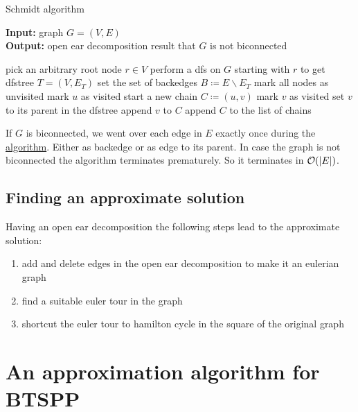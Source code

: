 \begin{algorithm}
  \caption{Schmidt algorithm}\label{alg:schmidt}
  \textbf{Input: } graph \(G = (V, E)\)\\
  \textbf{Output: } open ear decomposition result that \(G\) is not biconnected
  \begin{algorithmic}[1]
      \State pick an arbitrary root node \(r \in V\)
      \State perform a \gls{dfs} on \(G\) starting with \(r\) to get \gls{dfstree} \(T = (V, E_T)\)
        \State{}
      \EndIf
      \State set the set of backedges \(B \coloneqq E \backslash E_T\)
      \State mark all nodes as unvisited
            \State mark \(u\) as visited
            \State start a new chain \(C \coloneqq (u, v)\)
              \State mark \(v\) as visited
              \State set \(v\) to its parent in the \gls{dfstree}
              \State append \(v\) to \(C\)
                \State{}
              \EndIf
            \EndWhile
            \State append \(C\) to the list of chains
          \EndIf
        \EndFor
      \EndFor
          \State{}
        \EndIf
      \EndFor
      \State{}
    \EndProcedure
  \end{algorithmic}
\end{algorithm}

If \(G\) is biconnected, we went over each edge in \(E\) exactly once during the \hyperref[alg:schmidt]{algorithm}. Either as backedge or as edge to its parent. In case the graph is not biconnected the algorithm terminates prematurely. So it terminates in \(\mathcal{O}(\vert E \vert)\).

\subsection{Finding an approximate solution}
Having an open ear decomposition the following steps lead to the approximate solution:
\begin{enumerate}
  \item add and delete edges in the open ear decomposition to make it an eulerian graph
  \item find a suitable euler tour in the graph
  \item shortcut the euler tour to hamilton cycle in the square of the original graph
\end{enumerate}

\section{An approximation algorithm for BTSPP}
